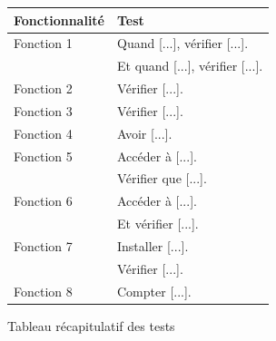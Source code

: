 \begin{figure}[!h]
\begin{center}
\begin{tabularx}{17cm}{|p{6cm}|X|}
  \hline
  Fonctionnalité & Test\\
  \hline
  Fonction 1 & Quand [...], vérifier [...]. \tabularnewline
  & Et quand [...], vérifier [...]. \tabularnewline
  Fonction 2 & Vérifier [...]. \tabularnewline
  Fonction 3 & Vérifier [...]. \tabularnewline
  Fonction 4 & Avoir [...]. \tabularnewline
  Fonction 5 & Accéder à [...]. \tabularnewline
   & Vérifier que [...]. \tabularnewline
  Fonction 6 & Accéder à [...]. \tabularnewline
   & Et vérifier [...]. \tabularnewline
  Fonction 7 & Installer [...]. \tabularnewline
   & Vérifier [...]. \tabularnewline
  Fonction 8 & Compter [...]. \tabularnewline
  \hline
\end{tabularx}
\end{center}
\caption{Tableau récapitulatif des tests}
\end{figure}
\fi